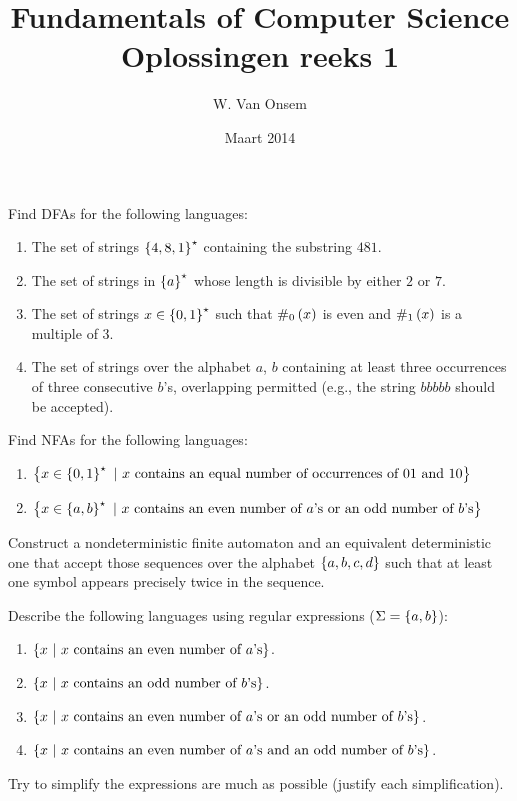 \documentclass{article}
\title{Fundamentals of Computer Science\\Oplossingen reeks 1}
\author{W. Van Onsem}
\date{Maart 2014}
\begin{document}
\maketitle
\begin{question}
Find DFAs for the following languages:
\begin{enumerate}
 \item The set of strings $\left\{ 4,8,1 \right\}^{\star}$ containing the substring $481$.
 \item The set of strings in $\left\{ a \right\}^{\star}$ whose length is divisible by either $2$ or $7$.
 \item The set of strings $x\in\left\{ 0,1 \right\}^{\star}$ such that $\#_0\left( x \right)$ is even and $\#_1\left( x \right)$ is a multiple of $3$.
 \item The set of strings over the alphabet $a$, $b$ containing at least three occurrences of three consecutive $b$'s, overlapping permitted (e.g., the string $bbbbb$ should be accepted).
\end{enumerate}
\begin{answer}
\end{answer}
\end{question}
\begin{question}
Find NFAs for the following languages:
\begin{enumerate}
 \item $\left\{ x\in\left\{ 0,1 \right\}^{\star}\ |\ \mbox{$x$ contains an equal number of occurrences of $01$ and $10$} \right\}$
 \item $\left\{ x\in\left\{ a,b \right\}^{\star}\ |\ \mbox{$x$ contains an even number of $a$'s or an odd number of $b$'s} \right\}$
\end{enumerate}
\begin{answer}
\end{answer}
\end{question}
\begin{question}
Construct a nondeterministic finite automaton and an equivalent deterministic one that accept those sequences over the alphabet $\left\{ a,b,c,d \right\}$ such that at least one symbol appears precisely twice in the sequence.
\begin{answer}
\end{answer}
\end{question}
\begin{question}
Describe the following languages using regular expressions ($\Sigma=\left\{ a,b \right\}$):
\begin{enumerate}
 \item $\left\{ x\ |\ \mbox{$x$ contains an even number of $a$'s} \right\}$.
 \item $\left\{ x\ |\ \mbox{$x$ contains an odd number of $b$'s} \right\}$.
 \item $\left\{ x\ |\ \mbox{$x$ contains an even number of $a$'s or an odd number of $b$’s} \right\}$.
 \item $\left\{ x\ |\ \mbox{$x$ contains an even number of $a$'s and an odd number of $b$’s} \right\}$.
\end{enumerate}
Try to simplify the expressions are much as possible (justify each simplification).
\begin{answer}
\end{answer}
\end{question}
\end{document}
